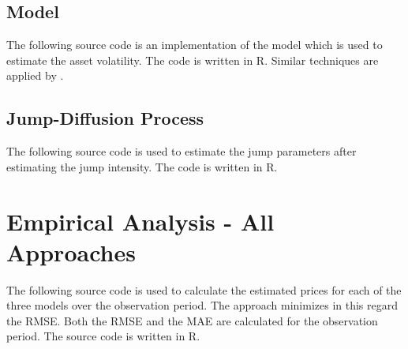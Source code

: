 \label{estimateCIRParameter}

\subsection{\citet{merton1974pricing} Model}
The following source code is an implementation of the \citet{merton1974pricing} model which is used to estimate the asset volatility. The code is written in R. Similar techniques are applied by \citet{stackoverflow2014code}.
\label{estimateMertonParameter}

\subsection{Jump-Diffusion Process}
The following source code is used to estimate the jump parameters after estimating the jump intensity. The code is written in R.
\label{estimateJumpsParameter}

\section{Empirical Analysis - All Approaches} \label{fuckinglastcode}
The following source code is used to calculate the estimated prices for each of the three models over the observation period. The approach minimizes in this regard the RMSE. Both the RMSE and the MAE are calculated for the observation period. The source code is written in R.


